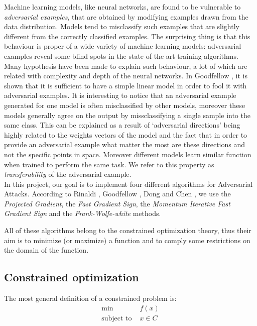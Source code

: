 \documentclass[10pt,twocolumn,letterpaper, english]{article}
\theoremstyle{definition}
\theoremstyle{plain}
\theoremstyle{plain}
\theoremstyle{plain}
\theoremstyle{plain}
\theoremstyle{remark}
\theoremstyle{remark}
\theoremstyle{definition}
\theoremstyle{definition}
\theoremstyle{definition}
\theoremstyle{definition}
\begin{document}
Machine learning models, like neural networks, are found to be vulnerable to \textit{adversarial examples}, that are obtained by modifying examples drawn from the data distribution. 
Models tend to misclassify such examples that are slightly different from the correctly classified examples. 
The surprising thing is that this behaviour is proper of a wide variety of machine learning models: adversarial examples reveal some blind spots in the state-of-the-art training algorithms. \\

Many hypothesis have been made to explain such behaviour, a lot of which are related with complexity and depth of the neural networks. 
In Goodfellow \cite{goodfellow}, it is shown that it is sufficient to have a simple linear model in order to fool it with adversarial examples. It is interesting to notice that an adversarial example generated for one model is often misclassified by other models, moreover these models generally agree on the output by missclassifying a single sample into the same class. This can be explained as a result of ‘adversarial directions’ being highly related to the weights vectors of the model and the fact that in order to provide an adversarial example what matter the most are these directions and not the specific points in space. Moreover different models learn similar function when trained to perform the same task. We refer to this property as \textit{transferability} of the adversarial example. \\ 

In this project, our goal is to implement four different algorithms for Adversarial Attacks. 
According to Rinaldi \cite{rinaldi}, Goodfellow \cite{goodfellow}, Dong \cite{momentum} and Chen \cite{frank}, we use the \textit{Projected Gradient}, the \textit{Fast Gradient Sign}, the \textit{Momentum Iterative Fast Gradient Sign} and the \textit{Frank-Wolfe-white} methods. 

All of these algorithms belong to the constrained optimization theory, thus their aim is to minimize (or maximize) a function and to comply some restrictions on the domain of the function. 

\subsection{Constrained optimization}

The most general definition of a constrained problem is: 
\begin{align}
    \min \,&f(x) \label{min_prob} \\
    \text{subject to } &x \in C \nonumber
\end{align}
\end{document}
